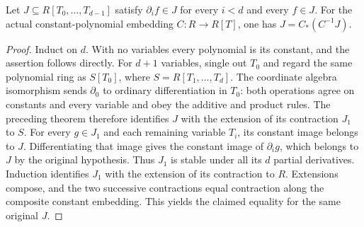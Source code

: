 \begin{theorem}
\label{hir:differential-stable-finite-polynomial-extension}
\leanok
Let $J\subseteq R[T_0,\ldots,T_{d-1}]$ satisfy
$\partial_i f\in J$ for every $i<d$ and every $f\in J$.
For the actual constant-polynomial embedding $C:R\longrightarrow R[T]$,
one has $J=C_*(C^{-1}J)$.
\end{theorem}
\begin{proof}
Induct on $d$. With no variables every polynomial is its constant, and
the assertion follows directly. For $d+1$ variables, single out $T_0$
and regard the same polynomial ring as $S[T_0]$, where
$S=R[T_1,\ldots,T_d]$. The coordinate algebra isomorphism sends
$\partial_0$ to ordinary differentiation in $T_0$: both operations agree
on constants and every variable and obey the additive and product rules.
The preceding theorem therefore identifies $J$ with the extension of its
contraction $J_1$ to $S$.
For every $g\in J_1$ and each remaining variable $T_i$, its constant image
belongs to $J$. Differentiating that image gives the constant image of
$\partial_i g$, which belongs to $J$ by the original hypothesis.
Thus $J_1$ is stable under all its $d$ partial derivatives. Induction
identifies $J_1$ with the extension of its contraction to $R$.
Extensions compose, and the two successive contractions equal contraction
along the composite constant embedding. This yields the claimed equality
for the same original $J$.
\end{proof}


